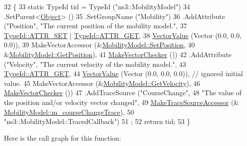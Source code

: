 \begin{DoxyCode}
32 \{
33   \textcolor{keyword}{static} TypeId tid = TypeId (\textcolor{stringliteral}{"ns3::MobilityModel"})
34     .SetParent<\hyperlink{classns3_1_1Object_a40860402e64d8008fb42329df7097cdb}{Object}> ()
35     .SetGroupName (\textcolor{stringliteral}{"Mobility"})
36     .AddAttribute (\textcolor{stringliteral}{"Position"}, \textcolor{stringliteral}{"The current position of the mobility model."},
37                    \hyperlink{classns3_1_1TypeId_a3ab7b43b95f96391c514d609ca60e542aa860aabfc04fde3f5fd95529cb706d9e}{TypeId::ATTR\_SET} | \hyperlink{classns3_1_1TypeId_a3ab7b43b95f96391c514d609ca60e542a3dd4b476c9b257285c177d6c414b5fd0}{TypeId::ATTR\_GET},
38                    \hyperlink{namespacens3_ab4d222fabede1ef17928ebcdf66ee21e}{VectorValue} (Vector (0.0, 0.0, 0.0)),
39                    MakeVectorAccessor (&\hyperlink{classns3_1_1MobilityModel_ac584b3d5a309709d2f13ed6ada1e7640}{MobilityModel::SetPosition},
40                                        &\hyperlink{classns3_1_1MobilityModel_aba838f06ec5bbb2d193d94b8c0e4abb4}{MobilityModel::GetPosition}),
41                    \hyperlink{namespacens3_ad316ead97f2b13c7b336e70c5a98f857}{MakeVectorChecker} ())
42     .AddAttribute (\textcolor{stringliteral}{"Velocity"}, \textcolor{stringliteral}{"The current velocity of the mobility model."},
43                    \hyperlink{classns3_1_1TypeId_a3ab7b43b95f96391c514d609ca60e542a3dd4b476c9b257285c177d6c414b5fd0}{TypeId::ATTR\_GET},
44                    \hyperlink{namespacens3_ab4d222fabede1ef17928ebcdf66ee21e}{VectorValue} (Vector (0.0, 0.0, 0.0)), \textcolor{comment}{// ignored initial value.}
45                    MakeVectorAccessor (&\hyperlink{classns3_1_1MobilityModel_a77004c56b45773bf57bdd3750887ced3}{MobilityModel::GetVelocity}),
46                    \hyperlink{namespacens3_ad316ead97f2b13c7b336e70c5a98f857}{MakeVectorChecker} ())
47     .AddTraceSource (\textcolor{stringliteral}{"CourseChange"}, 
48                      \textcolor{stringliteral}{"The value of the position and/or velocity vector changed"},
49                      \hyperlink{group__tracing_gab21a770b9855af4e8f69f7531ea4a6b0}{MakeTraceSourceAccessor} (&
      \hyperlink{classns3_1_1MobilityModel_a0392fd220a8880d5f56e4fb8546c455f}{MobilityModel::m\_courseChangeTrace}),
50                      \textcolor{stringliteral}{"ns3::MobilityModel::TracedCallback"})
51   ;
52   \textcolor{keywordflow}{return} tid;
53 \}
\end{DoxyCode}


Here is the call graph for this function\+:



